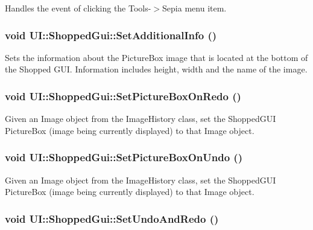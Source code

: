 \label{class_u_i_1_1_shopped_gui_a533354a0b2f7d07821793de2faca3e9e}
Handles the event of clicking the Tools-\/$>$Sepia menu item. \hypertarget{class_u_i_1_1_shopped_gui_a292a827437d7f2098c13bc1a735a569e}{
\subsubsection[{SetAdditionalInfo}]{\setlength{\rightskip}{0pt plus 5cm}void UI::ShoppedGui::SetAdditionalInfo ()}}
\label{class_u_i_1_1_shopped_gui_a292a827437d7f2098c13bc1a735a569e}
Sets the information about the PictureBox image that is located at the bottom of the Shopped GUI. Information includes height, width and the name of the image. \hypertarget{class_u_i_1_1_shopped_gui_ab6fbc914ecb121fa800ec2834daa4f37}{
\subsubsection[{SetPictureBoxOnRedo}]{\setlength{\rightskip}{0pt plus 5cm}void UI::ShoppedGui::SetPictureBoxOnRedo ()}}
\label{class_u_i_1_1_shopped_gui_ab6fbc914ecb121fa800ec2834daa4f37}
Given an Image object from the ImageHistory class, set the ShoppedGUI PictureBox (image being currently displayed) to that Image object. \hypertarget{class_u_i_1_1_shopped_gui_a62a62fa927ca572fb7d19f8116fc8858}{
\subsubsection[{SetPictureBoxOnUndo}]{\setlength{\rightskip}{0pt plus 5cm}void UI::ShoppedGui::SetPictureBoxOnUndo ()}}
\label{class_u_i_1_1_shopped_gui_a62a62fa927ca572fb7d19f8116fc8858}
Given an Image object from the ImageHistory class, set the ShoppedGUI PictureBox (image being currently displayed) to that Image object. \hypertarget{class_u_i_1_1_shopped_gui_a99e47a8b843bf190a7a0e3f8b3f5abb9}{
\subsubsection[{SetUndoAndRedo}]{\setlength{\rightskip}{0pt plus 5cm}void UI::ShoppedGui::SetUndoAndRedo ()}}
